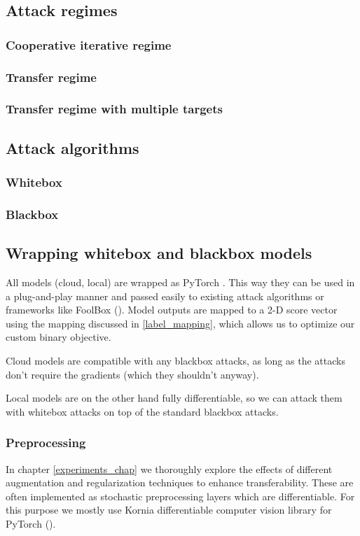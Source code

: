 \subsection{Attack regimes}
\subsubsection{Cooperative iterative regime}
\subsubsection{Transfer regime}
\subsubsection{Transfer regime with multiple targets}


\subsection{Attack algorithms}
\subsubsection{Whitebox}
\subsubsection{Blackbox}

\subsection{Wrapping whitebox and blackbox models}
All models (cloud, local) are wrapped as PyTorch . This way they can be used in a plug-and-play manner and passed easily to existing attack algorithms or frameworks like FoolBox (\cite{Rauber2020FoolboxNF}). Model outputs are mapped to a 2-D score vector using the mapping discussed in \ref{label_mapping}, which allows us to optimize our custom binary objective.

Cloud models are compatible with any blackbox attacks, as long as the attacks don't require the gradients (which they shouldn't anyway).

Local models are on the other hand fully differentiable, so we can attack them with whitebox attacks on top of the standard blackbox attacks. 

\subsubsection{Preprocessing}
In chapter \ref{experiments_chap} we thoroughly explore the effects of different augmentation and regularization techniques to enhance transferability. These are often implemented as stochastic preprocessing layers which are differentiable. For this purpose we mostly use Kornia \textendash \space differentiable computer vision library for PyTorch (\cite{riba2019kornia}).

